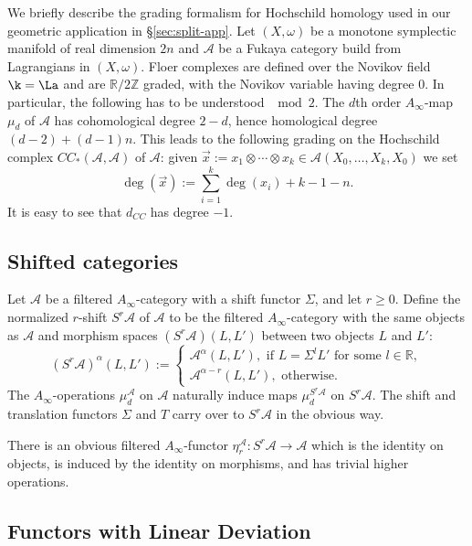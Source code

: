 We briefly describe the grading formalism for Hochschild homology used in our geometric application in \S\ref{sec:split-app}. Let $(X,\omega)$ be a monotone symplectic manifold of real dimension $2n$ and $\mathcal{A}$ be a Fukaya category build from Lagrangians in $(X,\omega)$. Floer complexes are defined over the Novikov field $\k=\La$ and are $\mathbb{R}/2\mathbb{Z}$ graded, with the Novikov variable having degree $0$. In particular, the following has to be understood $\mod 2$. The $d$th order $A_\infty$-map $\mu_d$ of $\mathcal{A}$ has cohomological degree $2-d$, hence homological degree $(d-2)+(d-1)n$. This leads to the following grading on the Hochschild complex $CC_*(\mathcal{A},\mathcal{A})$ of $\mathcal{A}$: given $\vec{x}:=x_1\otimes \cdots \otimes x_k\in \mathcal{A}(X_0,\ldots,X_k,X_0)$ we set $$\deg(\vec{x}):= \sum_{i=1}^k \deg(x_i)+k-1-n.$$ It is easy to see that $d_{CC}$ has degree $-1$.
\subsection{Shifted categories} \label{a:shifted} Let $\mathcal{A}$ be
a filtered $A_{\infty}$-category with a shift functor $\Sigma$, and
let $r \geq 0$. Define the normalized $r$-shift $S^r \mathcal{A}$ of
$\mathcal{A}$ to be the filtered $A_{\infty}$-category with the same
objects as $\mathcal{A}$ and morphism spaces $(S^r\mathcal{A})(L,L')$
between two objects $L$ and $L'$:
$$(S^r \mathcal{A})^{\alpha}(L,L'):=
\begin{cases} \mathcal{A}^{\alpha}(L,L'), \text{ if } L=\Sigma^lL'
  \text{ for some } l\in \mathbb R, \\ \mathcal{A}^{\alpha - r}
  (L,L'), \text{ otherwise.}
\end{cases}
$$
The $A_{\infty}$-operations $\mu^{\mathcal{A}}_d$ on $\mathcal{A}$
naturally induce maps $\mu^{S^r \mathcal{A}}_d$ on $S^r
\mathcal{A}$. The shift and translation functors $\Sigma$ and $T$
carry over to $S^r \mathcal{A}$ in the obvious way.

There is an obvious filtered $A_\infty$-functor
$\eta_r^{\mathcal{A}} : S^r \mathcal{A} \longrightarrow \mathcal{A}$
which is the identity on objects, is induced by the identity on
morphisms, and has trivial higher operations.



\subsection{Functors with Linear Deviation} \label{a:func-LD}

